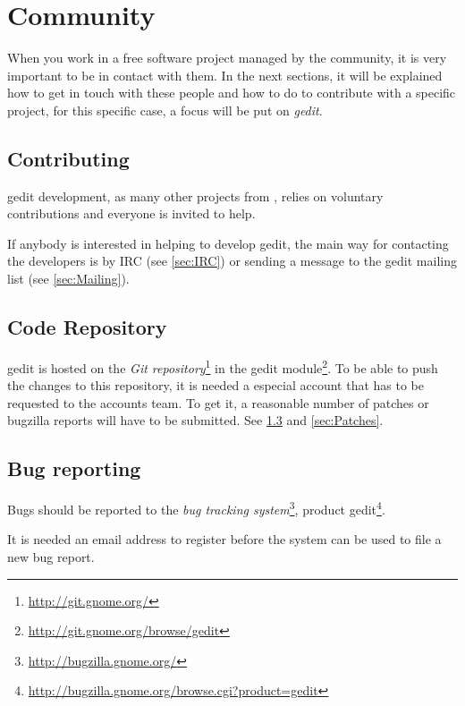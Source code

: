 
\chapter{Community}\label{chap:community}

When you work in a free software project managed by the community, it is very important to be in contact with them. In the next sections, it will be explained how to get in touch with these people and how to do to contribute with a specific project, for this specific case, a focus will be put on \emph{gedit}\cite{website:gedit}.

\section{Contributing}\label{sec:Contributing}

gedit development, as many other projects from \GNOME, relies on voluntary contributions and everyone is invited to help.

If anybody is interested in helping to develop gedit, the main way for contacting the developers is by IRC (see \ref{sec:IRC}) or sending a message to the gedit mailing list (see \ref{sec:Mailing}).

\section{Code Repository}\label{sec:Repository}

gedit is hosted on the \emph{\GNOME Git repository}\footnote{\url{http://git.gnome.org/}} in the gedit module\footnote{\url{http://git.gnome.org/browse/gedit}}. To be able to push the changes to this repository, it is needed a especial account that has to be requested to the \GNOME accounts team. To get it, a reasonable number of patches or bugzilla reports will have to be submitted. See \ref{sec:Bugs} and \ref{sec:Patches}.

\section{Bug reporting}\label{sec:Bugs}

Bugs should be reported to the \emph{\GNOME bug tracking system}\footnote{\url{http://bugzilla.gnome.org/}}, product gedit\footnote{\url{http://bugzilla.gnome.org/browse.cgi?product=gedit}}.

It is needed an email address to register before the system can be used to file a new bug report.

